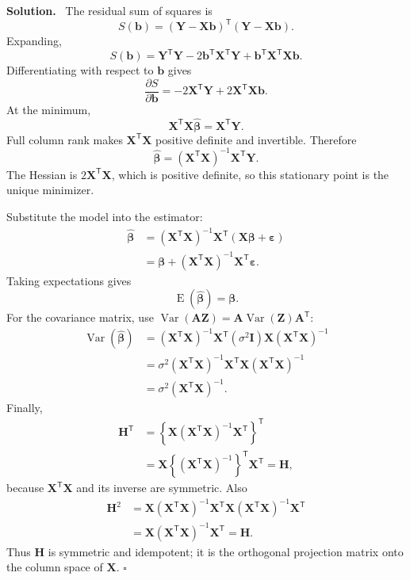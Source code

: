 \documentclass[11pt]{article}
\newcommand{\Var}{\operatorname{Var}}
\newcommand{\E}{\operatorname{E}}
\newenvironment{solution}
  {\noindent\color{darkgreen}\textbf{Solution.}\color{black}\ }
  {\hfill$\square$\par\medskip}
\begin{document}
\begin{solution}
The residual sum of squares is
\[
 S(\mathbf b)
 =(\mathbf Y-\mathbf X\mathbf b)^{\mathsf T}
   (\mathbf Y-\mathbf X\mathbf b).
\]
Expanding,
\[
 S(\mathbf b)
 =\mathbf Y^{\mathsf T}\mathbf Y
  -2\mathbf b^{\mathsf T}\mathbf X^{\mathsf T}\mathbf Y
  +\mathbf b^{\mathsf T}\mathbf X^{\mathsf T}\mathbf X\mathbf b.
\]
Differentiating with respect to $\mathbf b$ gives
\[
 \frac{\partial S}{\partial\mathbf b}
 =-2\mathbf X^{\mathsf T}\mathbf Y
  +2\mathbf X^{\mathsf T}\mathbf X\mathbf b.
\]
At the minimum,
\[
 \mathbf X^{\mathsf T}\mathbf X\widehat{\boldsymbol\beta}
 =\mathbf X^{\mathsf T}\mathbf Y.
\]
Full column rank makes $\mathbf X^{\mathsf T}\mathbf X$ positive definite
and invertible. Therefore
\[
 \widehat{\boldsymbol\beta}
 =(\mathbf X^{\mathsf T}\mathbf X)^{-1}
   \mathbf X^{\mathsf T}\mathbf Y.
\]
The Hessian is $2\mathbf X^{\mathsf T}\mathbf X$, which is positive
definite, so this stationary point is the unique minimizer.

Substitute the model into the estimator:
\begin{align*}
\widehat{\boldsymbol\beta}
 &=(\mathbf X^{\mathsf T}\mathbf X)^{-1}
   \mathbf X^{\mathsf T}
   (\mathbf X\boldsymbol\beta+\boldsymbol\varepsilon)\\
 &=\boldsymbol\beta
  +(\mathbf X^{\mathsf T}\mathbf X)^{-1}
    \mathbf X^{\mathsf T}\boldsymbol\varepsilon.
\end{align*}
Taking expectations gives
\[
 \E(\widehat{\boldsymbol\beta})=\boldsymbol\beta.
\]
For the covariance matrix, use $\Var(\mathbf A\mathbf Z)
=\mathbf A\Var(\mathbf Z)\mathbf A^{\mathsf T}$:
\begin{align*}
\Var(\widehat{\boldsymbol\beta})
 &=(\mathbf X^{\mathsf T}\mathbf X)^{-1}\mathbf X^{\mathsf T}
   (\sigma^2\mathbf I)
   \mathbf X(\mathbf X^{\mathsf T}\mathbf X)^{-1}\\
 &=\sigma^2(\mathbf X^{\mathsf T}\mathbf X)^{-1}
   \mathbf X^{\mathsf T}\mathbf X
   (\mathbf X^{\mathsf T}\mathbf X)^{-1}\\
 &=\sigma^2(\mathbf X^{\mathsf T}\mathbf X)^{-1}.
\end{align*}
Finally,
\begin{align*}
\mathbf H^{\mathsf T}
 &=\left\{\mathbf X(\mathbf X^{\mathsf T}\mathbf X)^{-1}
             \mathbf X^{\mathsf T}\right\}^{\mathsf T}\\
 &=\mathbf X\left\{(\mathbf X^{\mathsf T}\mathbf X)^{-1}\right\}^{\mathsf T}
   \mathbf X^{\mathsf T}
 =\mathbf H,
\end{align*}
because $\mathbf X^{\mathsf T}\mathbf X$ and its inverse are symmetric. Also
\begin{align*}
\mathbf H^2
 &=\mathbf X(\mathbf X^{\mathsf T}\mathbf X)^{-1}
   \mathbf X^{\mathsf T}\mathbf X
   (\mathbf X^{\mathsf T}\mathbf X)^{-1}\mathbf X^{\mathsf T}\\
 &=\mathbf X(\mathbf X^{\mathsf T}\mathbf X)^{-1}
   \mathbf X^{\mathsf T}
 =\mathbf H.
\end{align*}
Thus $\mathbf H$ is symmetric and idempotent; it is the orthogonal projection
matrix onto the column space of $\mathbf X$.
\end{solution}
\end{document}
